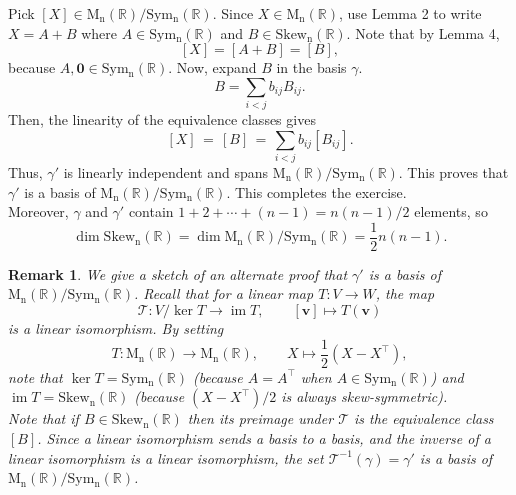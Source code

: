 \documentclass[10pt]{article}
\def\dim{\operatorname{dim}}
\def\image{\operatorname{im}}
\def\kernel{\operatorname{ker}}
\def\MnR{\operatorname{M_n(\mathbb{R})}}
\def\Sym{\operatorname{Sym_n(\mathbb{R})}}
\def\Skew{\operatorname{Skew_n(\mathbb{R})}}
\def\v{\bm{v}}
\newtheorem*{remark}{Remark}
\begin{document}
        Pick $[X] \in \MnR/\Sym$. Since $X \in \MnR$, use Lemma 2 to write $X = A + B$ where $A \in \Sym$ and $B \in \Skew$.
        Note that by Lemma 4, 
        \[
                [X] = [A + B] = [B],
        \]
        because $A, \mathbf{0} \in \Sym$.
        Now, expand $B$ in the basis $\gamma$.
        \[
                B = \sum_{i < j} b_{ij} B_{ij}.
        \]
        Then, the linearity of the equivalence classes gives
        \[
                [X] \,=\, [B] \,=\, \sum_{i < j} b_{ij} [B_{ij}].
        \]
        Thus, $\gamma'$ is linearly independent and spans $\MnR/\Sym$. This proves that $\gamma'$ is a basis of $\MnR/\Sym$.
        This completes the exercise. \\

        Moreover, $\gamma$ and $\gamma'$ contain $1 + 2 + \cdots + (n - 1) = n(n - 1)/2$ elements, so
        \[
                \dim{\Skew} = \dim{\MnR/\Sym} = \frac{1}{2}n(n - 1).
        \]


        \begin{remark}
                We give a sketch of an alternate proof that $\gamma' $ is a basis of $\MnR/\Sym$.
                Recall that for a linear map $T \colon V \to W$, the map
                \[
                        \mathscr{T}\colon V/\kernel{T} \to \image{T}, \qquad [\v] \mapsto T(\v)
                \]
                is a linear isomorphism. By setting
                \[
                        T\colon \MnR \to \MnR, \qquad X \mapsto \frac{1}{2}(X - X^\top),
                \]
                note that $\kernel{T} = \Sym$ (because $A = A^\top$ when $A \in \Sym$) and $\image{T} = \Skew$ (because $(X - X^\top)/2$
                is always skew-symmetric). \\

                Note that if $B \in \Skew$ then its preimage under $\mathscr{T}$ is the equivalence class $[B]$.
                Since a linear isomorphism sends a basis to a basis, and the inverse of a linear isomorphism
                is a linear isomorphism, the set $\mathscr{T}^{-1}(\gamma) = \gamma'$ is a basis of $\MnR/\Sym$.
        \end{remark}
\end{document}
